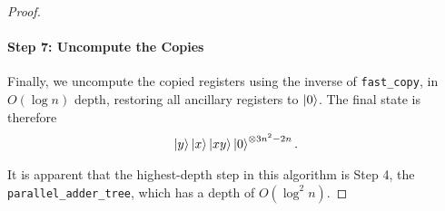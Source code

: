 \documentclass[reprint,amsmath,amssymb,aps,pra]{revtex4-2}
\begin{document}
\begin{proof}
    \paragraph{Step 7: Uncompute the Copies}
    Finally, we uncompute the copied registers using the inverse of \texttt{fast\_copy}, in $O(\log{n})$ depth, restoring all ancillary registers to $\ket{0}$. The final state is therefore
    \begin{align}
        \ket{y}\ket{x}\ket{xy}\ket{0}^{\otimes 3n^2-2n}.
    \end{align}

    
    It is apparent that the highest-depth step in this algorithm is Step 4, the \texttt{parallel\_adder\_tree}, which has a depth of $O(\log^2n)$.
    \end{proof}
    
    \begin{table}[t]
    \centering
        \caption{Concrete upper-bounded resource costs for each component of the Fast Quantum Multiplication Algorithm.}
    \label{table:results}
\end{table}
\end{document}
